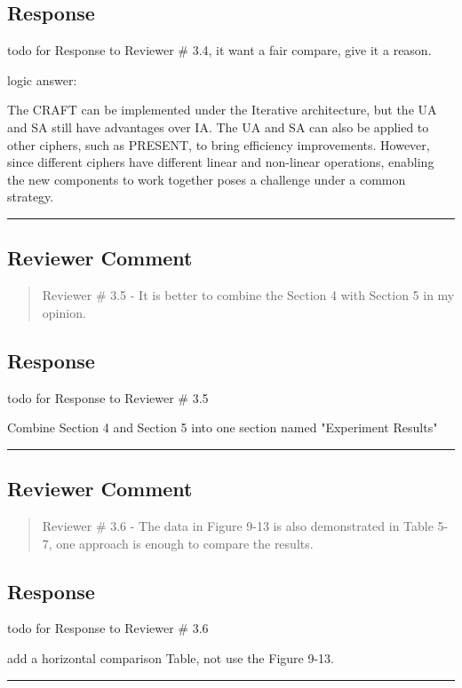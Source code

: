\subsection{Response}

todo for Response to Reviewer \# 3.4, it want a fair compare, give it a reason.

logic answer:

The CRAFT can be implemented under the Iterative architecture, but the UA and SA still have advantages over IA. The UA and SA can also be applied to other ciphers, such as PRESENT, to bring efficiency improvements. However, since different ciphers have different linear and non-linear operations, enabling the new components to work together poses a challenge under a common strategy.

\noindent\rule{\linewidth}{2.0pt}

\subsection{Reviewer Comment}
\begin{mdframed}
	\begin{quote}
		Reviewer \# 3.5 - It is better to combine the Section 4 with Section 5 in my opinion.
	\end{quote}
\end{mdframed}

\subsection{Response}

todo for Response to Reviewer \# 3.5

Combine Section 4 and Section 5 into one section named "Experiment Results"

\noindent\rule{\linewidth}{2.0pt}

\subsection{Reviewer Comment}
\begin{mdframed}
	\begin{quote}
		Reviewer \# 3.6 - The data in Figure 9-13 is also demonstrated in Table 5-7, one approach is enough to compare the results.
	\end{quote}
\end{mdframed}

\subsection{Response}

todo for Response to Reviewer \# 3.6

add a horizontal comparison Table, not use the Figure 9-13.

\noindent\rule{\linewidth}{6.0pt}